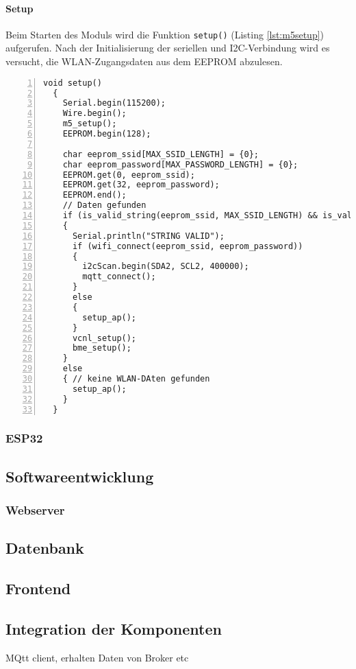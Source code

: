 \documentclass[12pt, letterpaper]{article}
\begin{document}
\paragraph{Setup}
\par Beim Starten des Moduls wird die Funktion \texttt{setup()} (Listing \ref{lst:m5setup}) aufgerufen. Nach der Initialisierung der seriellen und I2C-Verbindung wird es versucht, die WLAN-Zugangsdaten aus dem EEPROM abzulesen. 
\begin{lstlisting}[frame=single, style=cpp, numbers=left, label={lst:m5setup}, caption={M5Stick: setup}]
  void setup()
  {
    Serial.begin(115200);
    Wire.begin();
    m5_setup();
    EEPROM.begin(128);
  
    char eeprom_ssid[MAX_SSID_LENGTH] = {0};
    char eeprom_password[MAX_PASSWORD_LENGTH] = {0};
    EEPROM.get(0, eeprom_ssid);
    EEPROM.get(32, eeprom_password);
    EEPROM.end();
    // Daten gefunden
    if (is_valid_string(eeprom_ssid, MAX_SSID_LENGTH) && is_valid_string(eeprom_password, MAX_PASSWORD_LENGTH))
    {
      Serial.println("STRING VALID");
      if (wifi_connect(eeprom_ssid, eeprom_password))
      {
        i2cScan.begin(SDA2, SCL2, 400000);
        mqtt_connect();
      }
      else
      {
        setup_ap();
      }
      vcnl_setup();
      bme_setup();
    }
    else
    { // keine WLAN-DAten gefunden
      setup_ap();
    }
  }
\end{lstlisting}


  \subsubsection{ESP32}

\subsection{Softwareentwicklung}
  \subsubsection{Webserver}
  \subsection{Datenbank}
  \subsection{Frontend}
  \subsection{Integration der Komponenten}
  \par MQtt client, erhalten Daten von Broker etc
\end{document}
